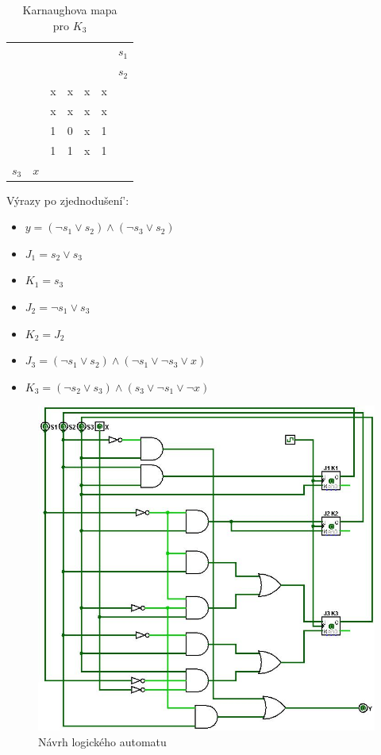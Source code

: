 \begin{table}[!h]
 \centering
        \caption{Karnaughova mapa\\ pro $K_3$}
    \begin{tabular}{lllllll}
      			       &       					 &       				 & 						 &	\colorbox{yellow}{}& \colorbox{yellow}{}	        &$s_1$ \\
    		 	       &        					&        & \colorbox{red}{}    & 	\colorbox{red}{}			      &         &$s_2$     \\
    		 	       &        					& x    				 & x    				   & x     				& x       &  \\
              	       & \colorbox{black}{}       & x     				 & x    				   & x   		  			& x       &  \\
\colorbox{blue}{}& \colorbox{black}{}       & 1    				 & 0     				   & x     				& 1       &  \\
\colorbox{blue}{}&       					 & 1   				 & 1				  	   & x    					& 1       &  \\
    	  $ s_3$ 	& $x$  					&     				 &       				   &       				  	 &          &  \\
    \end{tabular}%
\end{table}%
\pagebreak	
\newpage
\newpage


Výrazy po zjednodušení':
\begin{itemize}
\item $y = (\neg s_1 \lor s_2) \land (\neg s_3 \lor s_2)$
\item $J_1 = s_2 \lor s_3$
\item $K_1 = s_3$
\item $J_2 = \neg s_1 \lor s_3$
\item $K_2 = J_2$
\item $J_3 = (\neg s_1 \lor s_2) \land (\neg s_1 \lor \neg s_3 \lor x)$
\item $K_3 = (\neg s_2 \lor s_3) \land (s_3 \lor \neg s_1 \lor \neg x)$
\end{itemize}

	

\begin{figure}[h]
	\centering
	
		\includegraphics[scale=.5]{automat.jpg}
		\caption{Návrh logického automatu}
		\label{fig:klient01}
	\end{figure} 
	
	
 